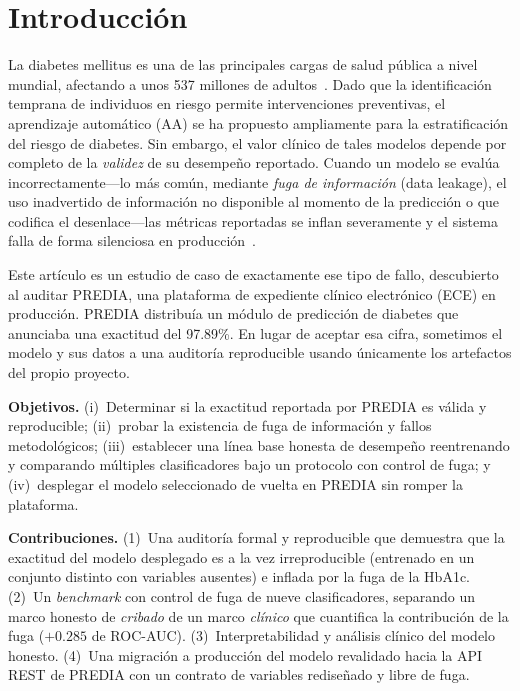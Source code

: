 \documentclass[conference]{IEEEtran}
\begin{document}
\section{Introducción}
La diabetes mellitus es una de las principales cargas de salud pública a nivel
mundial, afectando a unos 537 millones de adultos~\cite{idf2021atlas}. Dado que
la identificación temprana de individuos en riesgo permite intervenciones
preventivas, el aprendizaje automático (AA) se ha propuesto ampliamente para la
estratificación del riesgo de diabetes. Sin embargo, el valor clínico de tales
modelos depende por completo de la \emph{validez} de su desempeño reportado.
Cuando un modelo se evalúa incorrectamente---lo más común, mediante \emph{fuga
de información} (data leakage), el uso inadvertido de información no disponible
al momento de la predicción o que codifica el desenlace---las métricas
reportadas se inflan severamente y el sistema falla de forma silenciosa en
producción~\cite{kaufman2012leakage,kapoor2023leakage}.

Este artículo es un estudio de caso de exactamente ese tipo de fallo,
descubierto al auditar PREDIA, una plataforma de expediente clínico electrónico
(ECE) en producción. PREDIA distribuía un módulo de predicción de diabetes que
anunciaba una exactitud del 97.89\%. En lugar de aceptar esa cifra, sometimos el
modelo y sus datos a una auditoría reproducible usando únicamente los artefactos
del propio proyecto.

\textbf{Objetivos.} (i)~Determinar si la exactitud reportada por PREDIA es válida
y reproducible; (ii)~probar la existencia de fuga de información y fallos
metodológicos; (iii)~establecer una línea base honesta de desempeño reentrenando
y comparando múltiples clasificadores bajo un protocolo con control de fuga; y
(iv)~desplegar el modelo seleccionado de vuelta en PREDIA sin romper la
plataforma.

\textbf{Contribuciones.} (1)~Una auditoría formal y reproducible que demuestra
que la exactitud del modelo desplegado es a la vez irreproducible (entrenado en
un conjunto distinto con variables ausentes) e inflada por la fuga de la HbA1c.
(2)~Un \emph{benchmark} con control de fuga de nueve clasificadores, separando un
marco honesto de \emph{cribado} de un marco \emph{clínico} que cuantifica la
contribución de la fuga ($+0.285$ de ROC-AUC). (3)~Interpretabilidad y análisis
clínico del modelo honesto. (4)~Una migración a producción del modelo revalidado
hacia la API REST de PREDIA con un contrato de variables rediseñado y libre de
fuga.
\end{document}
